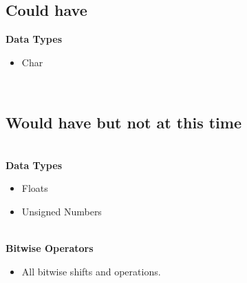 \subsection{Could have}
\textbf{Data Types }
\begin{itemize} 
    \item Char
\end{itemize} 
\\
\subsection{Would have but not at this time }
\\
\textbf{Data Types }
\begin{itemize} 
    \item Floats
    \item Unsigned Numbers
\end{itemize} 
\\
\textbf{Bitwise Operators }
\begin{itemize} 
    \item All bitwise shifts and operations. 
\end{itemize} 

\fi
